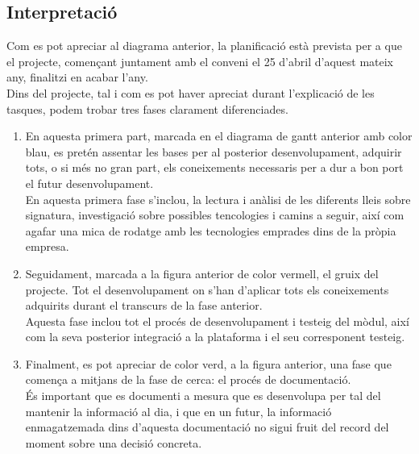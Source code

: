 \subsection{Interpretació}
Com es pot apreciar al diagrama anterior, la planificació està prevista per a que el projecte, començant juntament amb el conveni el 25 d'abril d'aquest mateix any, finalitzi en acabar l'any.\\
\newline Dins del projecte, tal i com es pot haver apreciat durant l'explicació de les tasques, podem trobar tres fases clarament diferenciades.
\renewcommand{\labelenumi}{\roman{enumi}}
\begin{enumerate}
	\item En aquesta primera part, marcada en el diagrama de gantt anterior amb color blau, es pretén assentar les bases per al posterior desenvolupament, adquirir tots, o si més no gran part,  els coneixements necessaris per a dur a bon port el futur desenvolupament.\\
		\newline En aquesta primera fase s'inclou, la lectura i anàlisi de les diferents lleis sobre signatura, investigació sobre possibles tencologies i camins a seguir, així com agafar una mica de rodatge amb les tecnologies emprades dins de la pròpia empresa.
	\item Seguidament, marcada a la figura anterior de color vermell, el gruix del projecte. Tot el desenvolupament on s'han d'aplicar tots els coneixements adquirits durant el transcurs de la fase anterior.\\
		\newline Aquesta fase inclou tot el procés de desenvolupament i testeig del mòdul, així com la seva posterior integració a la plataforma i el seu corresponent testeig.
	\item Finalment, es pot apreciar de color verd, a la figura anterior, una fase que comença a mitjans de la fase de cerca: el procés de documentació.\\
		\newline És important que es documenti a mesura que es desenvolupa per tal del mantenir la informació al dia, i que en un futur, la informació enmagatzemada dins d'aquesta documentació no sigui fruit del record del moment sobre una decisió concreta.
\end{enumerate}


